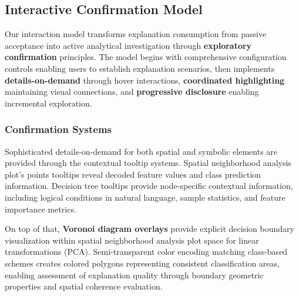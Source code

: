 \subsection{Interactive Confirmation Model}

Our interaction model transforms explanation consumption from passive acceptance into active analytical investigation through \textbf{exploratory confirmation} principles. The model begins with comprehensive configuration controls enabling users to establish explanation scenarios, then implements \textbf{details-on-demand} through hover interactions, \textbf{coordinated highlighting} maintaining visual connections, and \textbf{progressive disclosure} enabling incremental exploration.

\subsubsection{Confirmation Systems}

Sophisticated details-on-demand for both spatial and symbolic elements
are provided through the contextual tooltip systems. 
Spatial neighborhood analysis plot's points tooltips reveal decoded feature values and class prediction information. Decision tree tooltips provide node-specific contextual information, including logical conditions in natural language, sample statistics, and feature importance metrics.

On top of that,
\textbf{Voronoi diagram overlays} provide explicit decision boundary visualization within spatial neighborhood analysis plot space for linear transformations (PCA). Semi-transparent color encoding matching class-based schemes creates colored polygons representing consistent classification areas, enabling assessment of explanation quality through boundary geometric properties and spatial coherence evaluation.